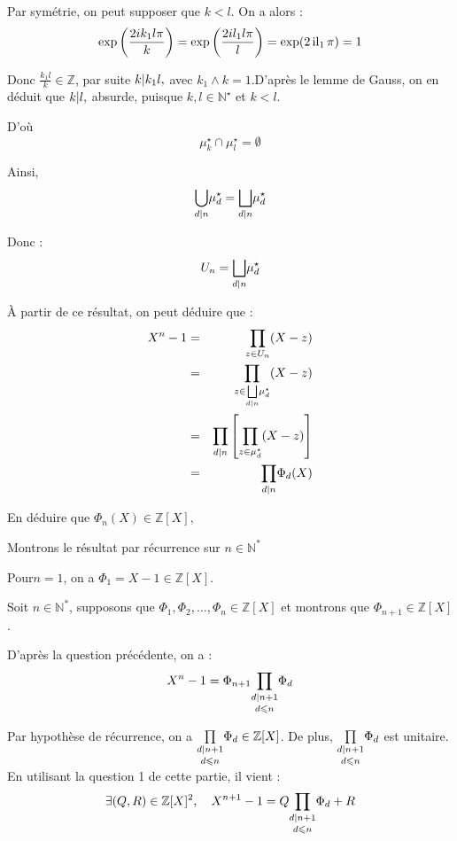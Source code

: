 Par sym{\'e}trie, on peut supposer que $k < l$. On a alors :
\[ \exp \left( \frac{2 i k_1 l \pi}{k} \right) = \exp \left( \frac{2 i l_1 l
   \pi}{l} \right) = \exp (2 \operatorname{il}_1 \pi) = 1 \]


Donc $\frac{k_1 l}{k} \in \mathbb{Z}$, par suite $k | k_1 l ,$ avec
$k_1 \wedge k = 1$.D'apr{\`e}s le lemme de Gauss, on en d{\'e}duit que $k | l
,$ absurde, puisque $k, l \in \mathbb{N}^{\star}$ et $k < l$.

D'o{\`u}
\[ \mu_k^{\star} \cap \mu_l^{\star} = \emptyset \]


Ainsi,
\[ \underset{d | n }{\bigcup} \mu_d^{\star} = \underset{d | n
   }{\bigsqcup} \mu_d^{\star} \]


Donc :
\[ U_n = \underset{d | n }{\bigsqcup} \mu_d^{\star} \]


{\`A} partir de ce r{\'e}sultat, on peut d{\'e}duire que :
\begin{eqnarray*}
  X^n - 1 & = & \underset{z \in U_n}{\prod} (X - z)\\
  & = & \underset{z \in \underset{d | n }{\bigsqcup}
  \mu_d^{\star}}{\prod} (X - z)\\
  & = & \underset{d | n }{\prod} \left[ \underset{z \in
  \mu_d^{\star}}{\prod} (X - z) \right]\\
  & = & \underset{d | n }{\prod} \Phi_d (X)
\end{eqnarray*}


 En d{\'e}duire que $\Phi_n (X) \in \mathbb{Z} [X]$,

Montrons le r{\'e}sultat par r{\'e}currence sur $n \in \mathbb{N}^{\ast}$

Pour$n = 1$, on a $\Phi_1 = X - 1 \in \mathbb{Z} [X]$.

Soit $n \in \mathbb{N}^{\ast}$, supposons que $\Phi_1, \Phi_2, \ldots, \Phi_n
\in \mathbb{Z} [X]$ et montrons que $\Phi_{n + 1} \in \mathbb{Z} [X]$.

D'apr{\`e}s la question pr{\'e}c{\'e}dente, on a :
\[ X^n - 1 = \Phi_{n + 1} \underset{d \leqslant n}{\underset{d | n + 1
   }{\prod}} \Phi_d \]


Par hypoth{\`e}se de r{\'e}currence, on a $\underset{d \leqslant
n}{\underset{d | n + 1 }{\prod}} \Phi_d \in \mathbb{Z} [X]$. De
plus, $\underset{d \leqslant n}{\underset{d | n + 1 }{\prod}}
\Phi_d$ est unitaire. En utilisant la question 1 de cette partie, il vient :
\[ \exists (Q, R) \in \mathbb{Z} [X]^2, \quad X^{n + 1} - 1 = Q \underset{d
   \leqslant n}{\underset{d | n + 1 }{\prod}} \Phi_d + R \]


